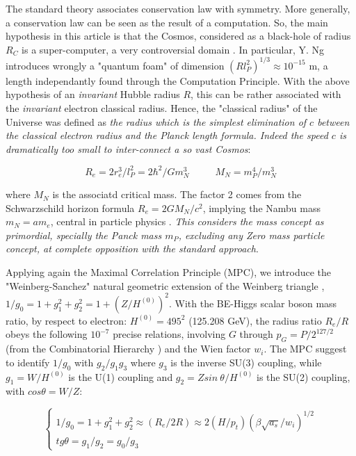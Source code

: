 \documentclass[a4paper,9pt]{article}
\begin{document}
The standard theory associates conservation law with symmetry. More generally, a conservation law can be seen as the result of a computation. So, the main hypothesis in this article is that the Cosmos, considered as a black-hole of radius $R_C$ is a super-computer, a very controversial domain \cite{Sanchez2}. In particular, Y. Ng \cite{Ng} introduces wrongly a "quantum foam" of dimension $(Rl_P^2)^{1/3} \approx 10^{-15} $ m, a length independantly found through the Computation Principle\cite{Sanchez2}. With the above hypothesis of an \textit{invariant} Hubble radius $R$, this can be rather associated with the \textit{invariant} electron classical radius. Hence, the "classical radius" of the Universe was defined as \textit{the radius which is the simplest elimination of $c$ between the classical electron radius and the Planck length formula. Indeed the speed $c$ is dramatically too small to inter-connect a so vast Cosmos}: 

\begin{equation}\label{Eq4}
R_e = 2r_e^3/l_P^2 = 2 \hbar^2/Gm_N^3 ~~~~~~~~~~~~ M_N = m_P^4/m_N^3
 \end{equation}
 
where $M_N$ is the associatd critical mass. The factor 2 comes from the Schwarzschild horizon formula $R_e  = 2GM_N /c^2$, implying the Nambu mass $m_N = am_e$, central in particle physics \cite{Nambu}. \textit{This considers the mass concept as primordial, specially the Panck mass $m_P$, excluding any Zero mass particle concept, at complete opposition with the standard approach}\cite{Sanchez3}.  

Applying again the Maximal Correlation Principle (MPC), we introduce the "Weinberg-Sanchez" natural geometric extension of the Weinberg triangle \cite{Taylor}, $1/g_0 = 1+g_1^2 +g_2^2 = 1 + (Z/H^{(0)})^2$. With the BE-Higgs scalar boson mass ratio, by respect to electron:  $H^{(0)} = 495^2$ (125.208 GeV)\cite{Sanchez3}, the radius ratio $R_e/R$ obeys the following $10^{-7}$ precise relations, involving $G$ through $p_G = P/2^{127/2}$ (from the Combinatorial Hierarchy \cite{Bastin}) and the Wien factor $w_i$. The MPC suggest to identify $1/g_0$ with $g_2/g_1g_3$ where $g_3$ is the inverse SU(3) coupling, while $g_1 = W/H^{(0)}$ is the U(1) coupling and $g_2 = Z sin~\theta/H^{(0)}$ is the SU(2) coupling, with $cos\theta = W/Z$: 


\begin{equation}\label{Eq5}
 \left\{
    \begin{array}{ll}
    1/g_0 = 1+g_1^2 +g_2^2 \approx (R_e/2R) \approx 2(H/p_t)(\beta \sqrt {a_s}/w_i)^{1/2}\\
    
   tg \theta =  g_1/g_2 = g_0/g_3
    
    \end{array}
\right.
\end{equation}
\end{document}
